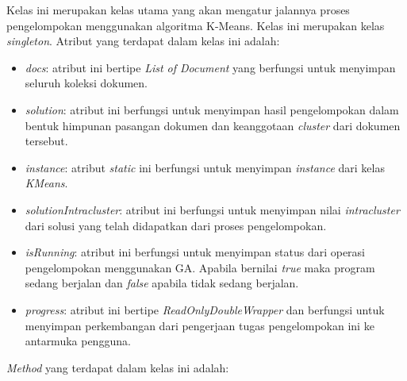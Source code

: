 Kelas ini merupakan kelas utama yang akan mengatur jalannya proses pengelompokan menggunakan algoritma K-Means. Kelas ini merupakan kelas \textit{singleton}. Atribut yang terdapat dalam kelas ini adalah:

\begin{itemize}
	\item \textit{docs}: atribut ini bertipe \textit{List of Document} yang berfungsi untuk menyimpan seluruh koleksi dokumen.
	\item \textit{solution}: atribut ini berfungsi untuk menyimpan hasil pengelompokan dalam bentuk himpunan pasangan dokumen dan keanggotaan \textit{cluster} dari dokumen tersebut.
	\item \textit{instance}: atribut \textit{static} ini berfungsi untuk menyimpan \textit{instance} dari kelas \textit{KMeans}.
	\item \textit{solutionIntracluster}: atribut ini berfungsi untuk menyimpan nilai \textit{intracluster} dari solusi yang telah didapatkan dari proses pengelompokan.
	\item \textit{isRunning}: atribut ini berfungsi untuk menyimpan status dari operasi pengelompokan menggunakan GA. Apabila bernilai \textit{true} maka program sedang berjalan dan \textit{false} apabila tidak sedang berjalan.
	\item \textit{progress}: atribut ini bertipe \textit{ReadOnlyDoubleWrapper} dan berfungsi untuk menyimpan perkembangan dari pengerjaan tugas pengelompokan ini ke antarmuka pengguna.
\end{itemize}

\textit{Method} yang terdapat dalam kelas ini adalah:

